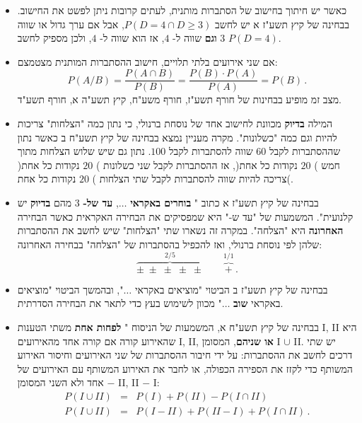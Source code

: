 \begin{itemize}

\item
כאשר יש חיתוך בחישוב של הסתברות מותנית, לעתים קרובות ניתן לפשט את החישוב. בבחינה של קיץ תשע"ז א יש לחשב
$P(D=4\cap D\ge 3)$,
אבל אם ערך גדול או שווה
$3$
\textbf{וגם}
שווה ל-%
$4$,
אז הוא שווה ל-%
$4$, 
ולכן מספיק לחשב
$P(D=4)$.


\item
אם שני אירועים בלתי תלויים, חישוב ההסתברות המותנית מצטמצם:
\[
P(A/B) = \frac{P(A\cap B)}{P(B)} = \frac{P(B)\cdot P(A)}{P(A)}= P(B)\,.
\]
מצב זמ מופיע בבחינות של חורף תשע"ז, חורף משע"ח, קיץ תשע"ה א, חורף תשע"ד.

\np

\item
המילה 
\textbf{בדיוק}
מכוונת לחישוב אחד של נוסחת ברנולי, כי נתון כמה "הצלחות" צריכות להיות וגם כמה "כשלונות". מקרה מעניין נמצא בבחינה של קיץ תשע"ח ב כאשר נתון שההסתברות לקבל 
$60$
שווה להסתברות לקבל
$100$.
נתון גם שיש שלוש הצלחות מתוך חמש )%
$20$
נקודות כל אחת(, אז ההסתברות לקבל שני כשלונות )%
$20$
נקודות כל אחת( צריכה להיות שווה להסתברות לקבל שתי הצלחות )%
$20$
נקודות כל אחת(.


\item
בבחינה של קיץ תשע"ז א כתוב "%
\textbf{בוחרים באקראי}
$\ldots$,
\textbf{עד של-}
$3$
מהם
\textbf{בדיוק}
יש קלנועית". המשמעות של "עד ש-" היא שמפסיקים את הבחירה האקראית כאשר הבחירה 
\textbf{האחרונה} 
היא "הצלחה". במקרה זה נשארו שתי "הצלחות" שיש לחשב את ההסתברות שלהן לפי נוסחת ברנולי, ואז להכפיל בהסתברות של "הצלחה" בבחירה האחרונה:
\[
\overbrace{\pm\;\pm\;\pm\;\pm\;\pm}^{2/5}\quad\quad \overbrace{+}^{1/1}\,.
\]
\vspace{-6ex}

\item
בבחינה של קיץ תשע"ז ב הביטוי "מוציאים באקראי
$\ldots$",
ובהמשך הביטוי "מוציאים באקראי
\textbf{שוב}
$\ldots$"
מכוון לשימוש בעץ כדי לתאר את הבחירה הסדרתית.


\item
בבחינה של קיץ תשע"ח א, המשמעות של הניסוח "%
\textbf{לפחות אחת}
משתי הטענות I, II היא שהאירוע קורה אם קורה אחד מהאירועים I, II,
\textbf{או שניהם},
המסומן I
$\cup$
II.
יש שתי דרכים לחשב את ההסתברות: על ידי חיבור ההסתברות של שני האירועים וחיסור האירוע המשותף כדי לקזז את הספירה הכפולה, או לחבר את האירוע המשותף עם האירועים של אחד ולא השני המסומן %
$-$%
II,
II%
$-$%
I:
\begin{eqnarray*}
P(I \cup II) &=& P(I) + P(II) - P(I \cap II)\\
P(I \cup II) &=& P(I-II) + P(II-I) + P(I \cap II)\,.
\end{eqnarray*}


\end{itemize}
